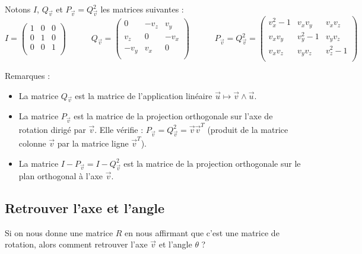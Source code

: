 \documentclass[11pt,class=report,crop=false]{standalone}
\begin{document}
Notons $I$, $Q_{\vec v}$ et $P_{\vec v} = Q_{\vec v}^2$ les matrices suivantes :
$$
I = \begin{pmatrix}
1 & 0 & 0 \\
0 & 1 & 0 \\
0 & 0 & 1 \\
\end{pmatrix}
\qquad\quad
Q_{\vec v} = \begin{pmatrix}
0 & -v_z & v_y \\
v_z & 0 & -v_x \\
-v_y & v_x & 0 \\
\end{pmatrix}
\qquad\quad
P_{\vec v} = Q_{\vec v}^2 =
\begin{pmatrix}
v_x^2-1 & v_x v_y & v_x v_z \\
v_x v_y & v_y^2-1 & v_y v_z \\
v_x v_z & v_y v_z & v_z^2-1 \\
\end{pmatrix} 
$$


Remarques :
\begin{itemize}
  \item La matrice $Q_{\vec v}$ est la matrice de l'application linéaire $\vec u \mapsto {\vec v} \wedge {\vec u}$.

  \item La matrice $P_{\vec v}$ est la matrice de la projection orthogonale sur l'axe de rotation dirigé par $\vec v$. Elle vérifie : $P_{\vec v} = Q_{\vec v}^2 = {\vec v}  {\vec v}^T$ (produit de la matrice  colonne $\vec v$ par la matrice ligne ${\vec v}^T$).

  \item La matrice $I-P_{\vec v} = I-Q_{\vec v}^2$ est la matrice de la projection orthogonale sur le plan orthogonal à l'axe $\vec v$.
\end{itemize}


\subsection{Retrouver l'axe et l'angle}

Si on nous donne une matrice $R$ en nous affirmant que c'est une matrice de rotation, alors comment retrouver l'axe $\vec v$ et l'angle $\theta$ ?
\end{document}
